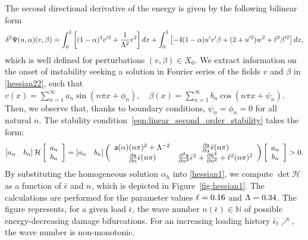 {The second directional derivative of the energy is given by the following bilinear form}
\begin{equation}
\delta^2 \Psi(u,\alpha)(v,\beta)=\int_0^1 \left[(1-\alpha)^2v'^2 
+\frac{1}{\Lambda^2} v^2 \right]dx
+\int_0^1
\left[ - 4(1-\alpha)u' v'\beta+(2+ u'^2)w^2+\ell^2\beta'^2 \right] dx, 
\label{hessian22}
\end{equation}
which is well defined for perturbations $(v, \beta)\in X_0$.
{We} extract information on the onset of instability  seeking a solution in Fourier series of the fields $v$ and $\beta$ in \eqref{hessian22}, such that $v(x)=\sum_{n=1}^{\infty} a_{n} \sin \left(n \pi x+\phi_{n}\right), \quad \beta(x)=\sum_{n=1}^{\infty} b_{n} \cos \left(n \pi x+\psi_{n}\right)$. Then, we observe that, thanks to boundary conditions, $\psi_{n}=\phi_{n}=0$ for all natural $n$. The stability condition~\eqref{eqn:linear_second_order_stability}  takes the form:
\begin{align}\left[ a_n \quad b_n \right] \mathcal{H} \left[ \begin{array}{c} a_n \\ b_n \end{array} \right]=\left[ a_n \quad b_n \right]\left(
\begin{array}{cc}
\mathsf{a}(\alpha)(n\pi)^2+\Lambda^{-2}  & \frac{\partial \mathsf{a}}{\partial \alpha}\bar\epsilon(n\pi)  \\
\frac{\partial \mathsf{a}}{\partial \alpha}\bar\epsilon(n\pi)  &   \frac{\partial^2 \mathsf{a}}{\partial \alpha^2}\bar\epsilon^2+ \frac{\partial h^2}{\partial \alpha^2}+\ell^2(n\pi)^2  \\
\end{array}
\right)\left[ \begin{array}{c} a_n \\ b_n \end{array} \right]>0.\label{hessian1}\end{align}
% 
By substituting the homogeneous solution $\alpha_h$ into \eqref{hessian1}, we compute $\det \mathcal{H}$ as a function of $\bar \epsilon$ and $n$, which is depicted in Figure~\ref{fig:hessian1}. The calculations are performed for the parameter values $\ell=0.16$ and $\Lambda=0.34$.
The figure represents, for a given load $\bar \epsilon$, the wave number $n(\bar \epsilon)\in \mathbb N$ of possible energy-decreasing damage bifurcations. For an increasing loading history $\bar \epsilon_t\nearrow$, the wave number is non-monotonic.
